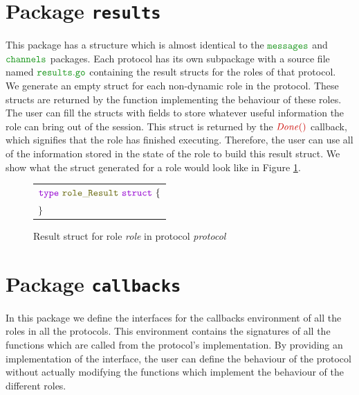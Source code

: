 \documentclass[12pt,twoside]{report}
\begin{document}

\section{Package \texttt{results}}
This package has a structure which is almost identical to the $\pkgname{messages}$ and $\pkgname{channels}$ packages. Each protocol has its own subpackage with a source file named $\filename{results}$ containing the result structs for the roles of that protocol.\\

We generate an empty struct for each non-dynamic role in the protocol. These structs are returned by the function implementing the behaviour of these roles. The user can fill the structs with fields to store whatever useful information the role can bring out of the session. This struct is returned by the $\functionname{Done()}$ callback, which signifies that the role has finished executing. Therefore, the user can use all of the information stored in the state of the role to build this result struct. We show what the struct generated for a role would look like in Figure \ref{result-struct-gen}.

\begin{figure}[!h]
    \begin{center}
        \begin{tabular}{l}
            $\gotype\ \structname{role\_\!Result}\ \gostruct\ \{$\\[3pt]
            $\}$
        \end{tabular}
    \end{center}
    \caption{Result struct for role \textit{role} in protocol \textit{protocol}}
    \label{result-struct-gen}
\end{figure}

\section{Package \texttt{callbacks}}\label{pkg-callbacks}
In this package we define the interfaces for the callbacks environment of all the roles in all the protocols. This environment contains the signatures of all the functions which are called from the protocol's implementation. By providing an implementation of the interface, the user can define the behaviour of the protocol without actually modifying the functions which implement the behaviour of the different roles.\\
\end{document}
